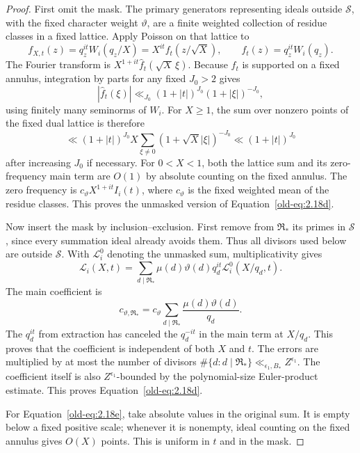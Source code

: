 \documentclass[12pt]{article}
\begin{document}
\begin{proof}
First omit the mask.  The primary generators representing ideals
outside \(\mathcal S\), with the fixed character weight
\(\vartheta\), are a finite weighted collection of residue
classes in a fixed lattice.  Apply Poisson on that lattice to
\[
 f_{X,t}(z)=q_z^{it}W_i(q_z/X)
           =X^{it}f_t(z/\sqrt X),\qquad
 f_t(z)=q_z^{it}W_i(q_z).
\]
The Fourier transform is
\(X^{1+it}\widehat f_t(\sqrt X\,\xi)\).
Because \(f_t\) is supported on a fixed annulus, integration by
parts for any fixed \(J_0>2\) gives
\[
 |\widehat f_t(\xi)|
 \ll_{J_0} (1+|t|)^{J_0}(1+|\xi|)^{-J_0},
\]
using finitely many seminorms of \(W_i\).  For \(X\ge1\), the
sum over nonzero points of the fixed dual lattice is therefore
\[
 \ll (1+|t|)^{J_0} X
       \sum_{\xi\ne0}(1+\sqrt X|\xi|)^{-J_0}
 \ll (1+|t|)^{J_0}
\]
after increasing \(J_0\) if necessary.  For \(0<X<1\), both the
lattice sum and its zero-frequency main term are \(O(1)\) by
absolute counting on the fixed annulus.  The zero frequency is
\(c_\vartheta X^{1+it}I_i(t)\), where \(c_\vartheta\) is the
fixed weighted mean of the residue classes.  This proves the
unmasked version of Equation~\eqref{old-eq:2.18d}.

Now insert the mask by inclusion--exclusion.  First remove from
\(\mathfrak R_*\) its primes in \(\mathcal S\), since every
summation ideal already avoids them.  Thus all divisors used below
are outside \(\mathcal S\).  With \(\mathcal L_i^0\) denoting
the unmasked sum, multiplicativity gives
\[
 \mathcal L_i(X,t)
 =\sum_{d\mid\mathfrak R_*}
       \mu(d)\vartheta(d)q_d^{it}\mathcal L_i^0(X/q_d,t).
\]
The main coefficient is
\[
 c_{\vartheta,\mathfrak R_*}
 =c_\vartheta\sum_{d\mid\mathfrak R_*}
             \frac{\mu(d)\vartheta(d)}{q_d}.
\]
The \(q_d^{it}\) from extraction has canceled the
\(q_d^{-it}\) in the main term at \(X/q_d\).  This proves that
the coefficient is independent of both \(X\) and \(t\).
The errors are multiplied by at most the number of divisors
\(\#\{d:d\mid\mathfrak R_*\}\ll_{\epsilon_1,B_*}Z^{\epsilon_1}\).
The coefficient itself is also \(Z^{\epsilon_1}\)-bounded by
the polynomial-size Euler-product estimate.  This proves
Equation~\eqref{old-eq:2.18d}.

For Equation~\eqref{old-eq:2.18e}, take absolute values in the
original sum.  It is empty below a fixed positive scale; whenever
it is nonempty, ideal counting on the fixed annulus gives \(O(X)\)
points.  This is uniform in \(t\) and in the mask.


\end{proof}
\end{document}
